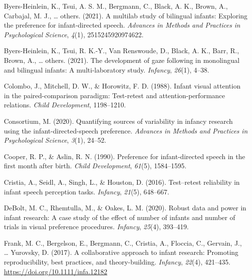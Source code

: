 \documentclass[
  english,
  man,floatsintext]{apa6}
\newlength{\cslhangindent}
\newlength{\cslentryspacingunit} %
\newenvironment{CSLReferences}[2] %
 {%
  \setlength{\parindent}{0pt}
  \ifodd #1
  \let\oldpar\par
  \def\par{\hangindent=\cslhangindent\oldpar}
  \fi
  \setlength{\parskip}{#2\cslentryspacingunit}
 }%
 {}
\begin{document}
\hypertarget{refs}{}
\begin{CSLReferences}{1}{0}
\leavevmode{}%
Byers-Heinlein, K., Tsui, A. S. M., Bergmann, C., Black, A. K., Brown, A., Carbajal, M. J., \ldots{} others. (2021). A multilab study of bilingual infants: Exploring the preference for infant-directed speech. \emph{Advances in Methods and Practices in Psychological Science}, \emph{4}(1), 2515245920974622.

\leavevmode{}%
Byers-Heinlein, K., Tsui, R. K.-Y., Van Renswoude, D., Black, A. K., Barr, R., Brown, A., \ldots{} others. (2021). The development of gaze following in monolingual and bilingual infants: A multi-laboratory study. \emph{Infancy}, \emph{26}(1), 4--38.

\leavevmode{}%
Colombo, J., Mitchell, D. W., \& Horowitz, F. D. (1988). Infant visual attention in the paired-comparison paradigm: Test-retest and attention-performance relations. \emph{Child Development}, 1198--1210.

\leavevmode{}%
Consortium, M. (2020). Quantifying sources of variability in infancy research using the infant-directed-speech preference. \emph{Advances in Methods and Practices in Psychological Science}, \emph{3}(1), 24--52.

\leavevmode{}%
Cooper, R. P., \& Aslin, R. N. (1990). Preference for infant-directed speech in the first month after birth. \emph{Child Development}, \emph{61}(5), 1584--1595.

\leavevmode{}%
Cristia, A., Seidl, A., Singh, L., \& Houston, D. (2016). Test--retest reliability in infant speech perception tasks. \emph{Infancy}, \emph{21}(5), 648--667.

\leavevmode{}%
DeBolt, M. C., Rhemtulla, M., \& Oakes, L. M. (2020). Robust data and power in infant research: A case study of the effect of number of infants and number of trials in visual preference procedures. \emph{Infancy}, \emph{25}(4), 393--419.

\leavevmode{}%
Frank, M. C., Bergelson, E., Bergmann, C., Cristia, A., Floccia, C., Gervain, J., \ldots{} Yurovsky, D. (2017). A collaborative approach to infant research: Promoting reproducibility, best practices, and theory-building. \emph{Infancy}, \emph{22}(4), 421--435. \url{https://doi.org/10.1111/infa.12182}


\end{CSLReferences}
\end{document}
